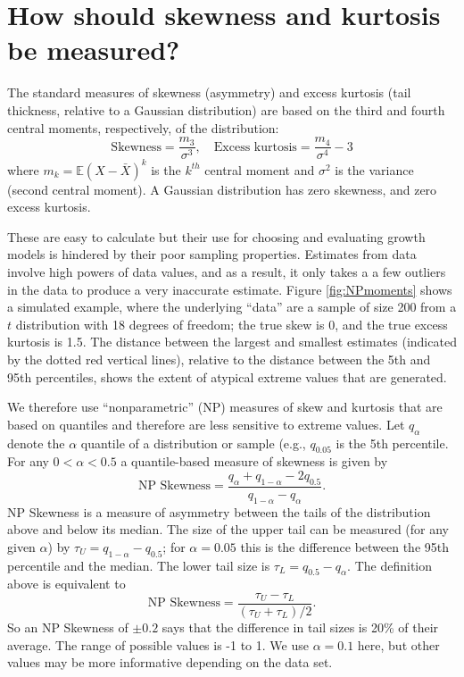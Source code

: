 \documentclass[11pt]{article}
\newcounter{box}
\newcommand{\be}{\begin{equation}}
\newcommand{\ee}{\end{equation}}
\begin{document}
{\section{How should skewness and kurtosis be measured?}
The standard measures of skewness (asymmetry) and excess kurtosis (tail thickness, relative 
to a Gaussian distribution) are based on the third and fourth central moments, respectively, of the distribution: 
\be
\mbox{Skewness} = \frac{m_3}{\sigma^3}, \quad \mbox{Excess kurtosis} = \frac{m_4}{\sigma^4}-3
\ee
where $m_k = \mathbb{E}(X - \bar{X})^k$ is the $k^{th}$ central moment and $\sigma^2$ is the variance (second central moment). 
A Gaussian distribution has zero skewness, and zero excess kurtosis. 

These are easy to calculate but their use for choosing and evaluating growth models is hindered by their
poor sampling properties. Estimates from data involve high powers of data values, and as a result, it only takes a 
a few outliers in the data to produce a very inaccurate estimate. Figure \ref{fig:NPmoments} shows a simulated example, where the
underlying ``data'' are a sample of size 200 from a $t$ distribution with 18 degrees of freedom; the true skew is 0, and the 
true excess kurtosis is 1.5. The distance between the largest and smallest estimates (indicated by the dotted red
vertical lines), relative to the distance between the 5th and 95th percentiles, shows the extent of atypical extreme values
that are generated. 

We therefore use ``nonparametric'' (NP) measures of skew and kurtosis that are based on quantiles and therefore are 
less sensitive to extreme values. Let $q_\alpha$ denote the $\alpha$ quantile of a distribution or sample (e.g., $q_{0.05}$ 
is the 5th percentile. For any $0 < \alpha < 0.5$ a quantile-based measure of skewness is given by \citep{mcgillivray-1986}
\be
\mbox{NP Skewness} = \frac{q_\alpha + q_{1-\alpha} - 2 q_{0.5}}{q_{1-\alpha} - q_\alpha}.
\ee
NP Skewness is a measure of asymmetry between the tails of the distribution above and below its median. The size of the upper
tail can be measured (for any given $\alpha$) by $\tau_U = q_{1-\alpha} - q_{0.5}$; for $\alpha=0.05$ this is the difference
between the 95th percentile and the median. The lower tail size is $\tau_L = q_{0.5} - q_\alpha$. The definition above
is equivalent to  
\be
\mbox{NP Skewness} = \frac{\tau_U - \tau_L}{(\tau_U + \tau_L)/2}.
\ee
So an NP Skewness of $\pm 0.2$ says that the difference in tail sizes is 20\% of their average. The range of possible values 
is -1 to 1. We use $\alpha=0.1$ here, but other values may be more informative depending on the data set. 
 
}
\end{document}
